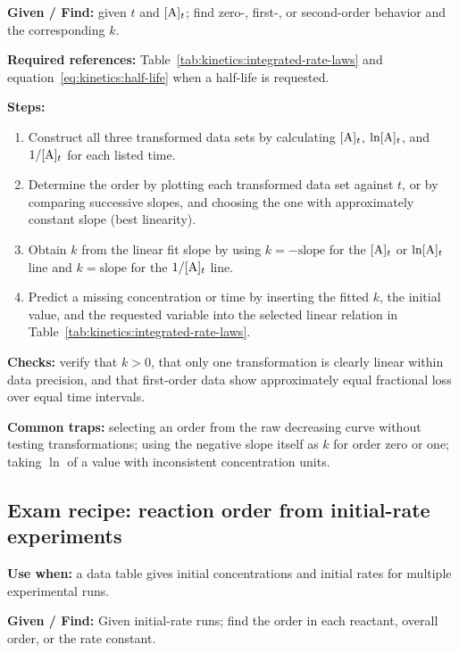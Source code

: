 \textbf{Given / Find:} given \(t\) and \([\ce{A}]_t\); find zero-, first-, or second-order behavior and the corresponding \(k\).

\textbf{Required references:} Table~\ref{tab:kinetics:integrated-rate-laws} and equation~\eqref{eq:kinetics:half-life} when a half-life is requested.


\textbf{Steps:}
\begin{enumerate}
    \item Construct all three transformed data sets by calculating \([\ce{A}]_t\), \(\ln[\ce{A}]_t\), and \(1/[\ce{A}]_t\) for each listed time.
    \item Determine the order by plotting each transformed data set against \(t\), or by comparing successive slopes, and choosing the one with approximately constant slope (best linearity).
    \item Obtain \(k\) from the linear fit slope by using \(k=-\text{slope}\) for the \([\ce{A}]_t\) or \(\ln[\ce{A}]_t\) line and \(k=\text{slope}\) for the \(1/[\ce{A}]_t\) line.
    \item Predict a missing concentration or time by inserting the fitted \(k\), the initial value, and the requested variable into the selected linear relation in Table~\ref{tab:kinetics:integrated-rate-laws}.
\end{enumerate}

\textbf{Checks:} verify that \(k>0\), that only one transformation is clearly linear within data precision, and that first-order data show approximately equal fractional loss over equal time intervals.

\textbf{Common traps:} selecting an order from the raw decreasing curve without testing transformations; using the negative slope itself as \(k\) for order zero or one; taking \(\ln\) of a value with inconsistent concentration units.

\subsection{Exam recipe: reaction order from initial-rate experiments}
\textbf{Use when:} a data table gives initial concentrations and initial rates for multiple experimental runs.

\textbf{Given / Find:} Given initial-rate runs; find the order in each reactant, overall order, or the rate constant.


